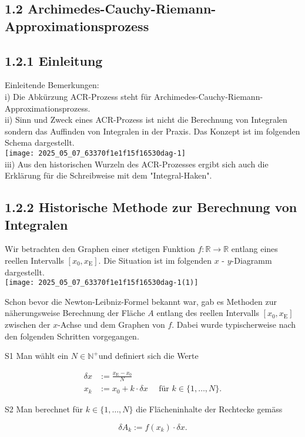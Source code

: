 \documentclass[10pt]{article}
\begin{document}
\subsection*{1.2 Archimedes-Cauchy-Riemann-Approximationsprozess}
\subsection*{1.2.1 Einleitung}
Einleitende Bemerkungen:\\
i) Die Abkürzung ACR-Prozess steht für Archimedes-Cauchy-Riemann- Approximationsprozess.\\
ii) Sinn und Zweck eines ACR-Prozess ist nicht die Berechnung von Integralen sondern das Auffinden von Integralen in der Praxis. Das Konzept ist im folgenden Schema dargestellt.\\
\texttt{[image: 2025\_05\_07\_63370f1e1f15f16530dag-1]}\\
iii) Aus den historischen Wurzeln des ACR-Prozesses ergibt sich auch die Erklärung für die Schreibweise mit dem "Integral-Haken".

\subsection*{1.2.2 Historische Methode zur Berechnung von Integralen}
Wir betrachten den Graphen einer stetigen Funktion $f: \mathbb{R} \rightarrow \mathbb{R}$ entlang eines reellen Intervalls $\left[x_{0}, x_{\mathrm{E}}\right]$. Die Situation ist im folgenden $x$ - $y$-Diagramm dargestellt.\\
\texttt{[image: 2025\_05\_07\_63370f1e1f15f16530dag-1(1)]}

Schon bevor die Newton-Leibniz-Formel bekannt war, gab es Methoden zur näherungsweise Berechnung der Fläche $A$ entlang des reellen Intervalls $\left[x_{0}, x_{\mathrm{E}}\right]$ zwischen der $x$-Achse und dem Graphen von $f$. Dabei wurde typischerweise nach den folgenden Schritten vorgegangen.

S1 Man wählt ein $N \in \mathbb{N}^{+}$und definiert sich die Werte


\begin{align*}
\delta x & :=\frac{x_{\mathrm{E}}-x_{0}}{N}  \tag{1.4}\\
x_{k} & :=x_{0}+k \cdot \delta x \quad \text { für } k \in\{1, \ldots, N\} . \tag{1.5}
\end{align*}


S2 Man berechnet für $k \in\{1, \ldots, N\}$ die Flächeninhalte der Rechtecke gemäss


\begin{equation*}
\delta A_{k}:=f\left(x_{k}\right) \cdot \delta x . \tag{1.6}
\end{equation*}
\end{document}
